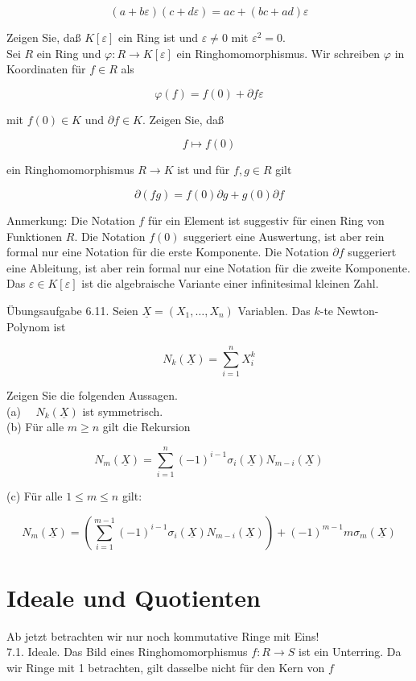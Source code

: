 \documentclass[10pt, letterpaper]{article}
\begin{document}
$$
(a+b \varepsilon)(c+d \varepsilon)=a c+(b c+a d) \varepsilon
$$

Zeigen Sie, daß $K[\varepsilon]$ ein Ring ist und $\varepsilon \neq 0$ mit $\varepsilon^{2}=0$.\\
Sei $R$ ein Ring und $\varphi: R \rightarrow K[\varepsilon]$ ein Ringhomomorphismus. Wir schreiben $\varphi$ in Koordinaten für $f \in R$ als

$$
\varphi(f)=f(0)+\partial f \varepsilon
$$

mit $f(0) \in K$ und $\partial f \in K$. Zeigen Sie, daß

$$
f \mapsto f(0)
$$

ein Ringhomomorphismus $R \rightarrow K$ ist und für $f, g \in R$ gilt

$$
\partial(f g)=f(0) \partial g+g(0) \partial f
$$

Anmerkung: Die Notation $f$ für ein Element ist suggestiv für einen Ring von Funktionen $R$. Die Notation $f(0)$ suggeriert eine Auswertung, ist aber rein formal nur eine Notation für die erste Komponente. Die Notation $\partial f$ suggeriert eine Ableitung, ist aber rein formal nur eine Notation für die zweite Komponente. Das $\varepsilon \in K[\varepsilon]$ ist die algebraische Variante einer infinitesimal kleinen Zahl.

Übungsaufgabe 6.11. Seien $\underline{X}=\left(X_{1}, \ldots, X_{n}\right)$ Variablen. Das $k$-te Newton-Polynom ist

$$
N_{k}(\underline{X})=\sum_{i=1}^{n} X_{i}^{k}
$$

Zeigen Sie die folgenden Aussagen.\\
(a) $\quad N_{k}(\underline{X})$ ist symmetrisch.\\
(b) Für alle $m \geq n$ gilt die Rekursion

$$
N_{m}(\underline{X})=\sum_{i=1}^{n}(-1)^{i-1} \sigma_{i}(\underline{X}) N_{m-i}(\underline{X})
$$

(c) Für alle $1 \leq m \leq n$ gilt:

$$
N_{m}(\underline{X})=\left(\sum_{i=1}^{m-1}(-1)^{i-1} \sigma_{i}(\underline{X}) N_{m-i}(\underline{X})\right)+(-1)^{m-1} m \sigma_{m}(\underline{X})
$$

\section*{Ideale und Quotienten}
Ab jetzt betrachten wir nur noch kommutative Ringe mit Eins!\\
7.1. Ideale. Das Bild eines Ringhomomorphismus $f: R \rightarrow S$ ist ein Unterring. Da wir Ringe mit 1 betrachten, gilt dasselbe nicht für den Kern von $f$
\end{document}
